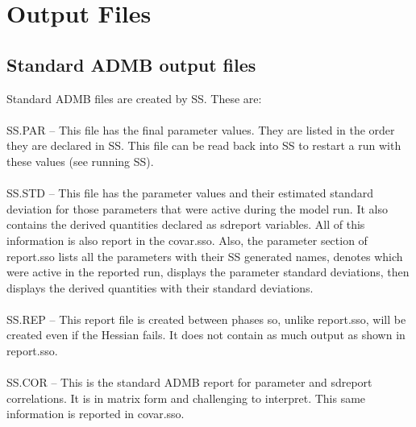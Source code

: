 \section{Output Files}
\subsection{Standard ADMB output files}
Standard ADMB files are created by SS.  These are:\\
\\
SS.PAR – This file has the final parameter values.  They are listed in the order they are declared in SS.  This file can be read back into SS to restart a run with these values (see running SS).\\
\\
SS.STD – This file has the parameter values and their estimated standard deviation for those parameters that were active during the model run.  It also contains the derived quantities declared as sdreport variables.  All of this information is also report in the covar.sso.  Also, the parameter section of report.sso lists all the parameters with their SS generated names, denotes which were active in the reported run, displays the parameter standard deviations, then displays the derived quantities with their standard deviations.\\
\\
SS.REP – This report file is created between phases so, unlike report.sso, will be created even if the Hessian fails.  It does not contain as much output as shown in report.sso.\\
\\
SS.COR – This is the standard ADMB report for parameter and sdreport correlations.  It is in matrix form and challenging to interpret.  This same information is reported in covar.sso.

